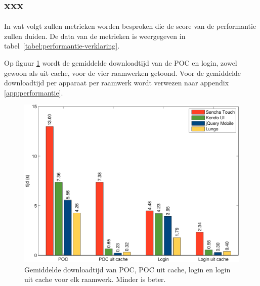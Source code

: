 
\subsection{xxx}
\label{sec:evaluatie-performantie-xxx}

In wat volgt zullen metrieken worden besproken die de score van de performantie zullen duiden.
De data van de metrieken is weergegeven in tabel~\ref{tabel:performantie-verklaring}.

Op figuur \ref{fig:performantie} wordt de gemiddelde downloadtijd van de POC en login, zowel gewoon als uit cache, voor de vier raamwerken getoond.
Voor de gemiddelde downloadtijd per apparaat per raamwerk wordt verwezen naar appendix \ref{app:performantie}.

\begin{figure}[H]
  \centering
  \includegraphics[width=\textwidth]{figuren/performance-nl.pdf}
  \caption{Gemiddelde downloadtijd van POC,  POC uit cache,  login en login uit cache voor elk raamwerk. Minder is beter.}
  \label{fig:performantie}
\end{figure}


